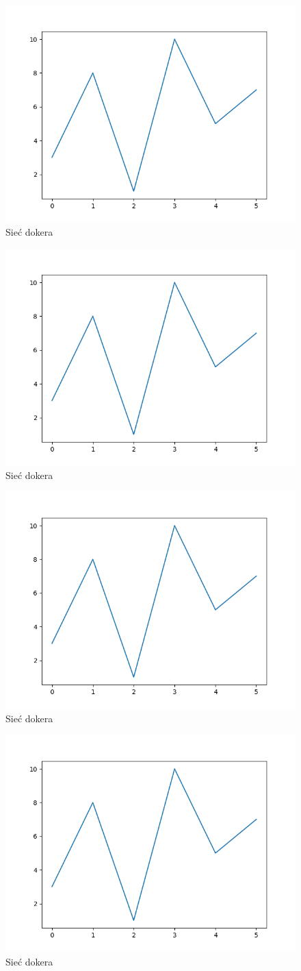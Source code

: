 \begin{figure}
  \centering\includegraphics[width=.6\textwidth]{images/example}
\caption{Sieć dokera \cite{docker_compose_reference}}  \label{rys:network}
\end{figure}
\begin{figure}
  \centering\includegraphics[width=.6\textwidth]{images/example}
\caption{Sieć dokera \cite{docker_compose_reference}}  \label{rys:network}
\end{figure}
\begin{figure}
  \centering\includegraphics[width=.6\textwidth]{images/example}
\caption{Sieć dokera \cite{docker_compose_reference}}  \label{rys:network}
\end{figure}
\begin{figure}
  \centering\includegraphics[width=.6\textwidth]{images/example}
\caption{Sieć dokera \cite{docker_compose_reference}}  \label{rys:network}
\end{figure}
